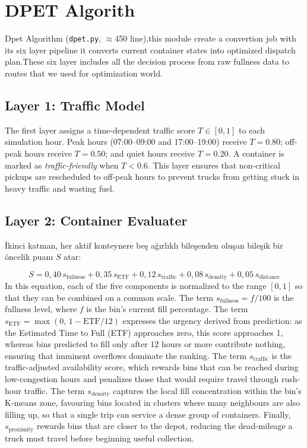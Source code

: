 \documentclass[12pt,a4paper]{report}
\begin{document}
\section{DPET Algorith}

\indent Dpet Algorithm (\texttt{dpet.py}, $\approx$450 line),this module create a convertion job with its six layer pipeline it converts current container states into optimized dispatch plan.These six layer includes all the decision process from raw fullness data to routes that we used for optimization world.

\subsection{Layer 1: Traffic Model}
\indent The first layer assigns a time-dependent traffic score $T \in [0, 1]$ to each simulation hour. Peak hours (07:00–09:00 and 17:00–19:00) receive $T = 0.80$; off-peak hours receive $T = 0.50$; and quiet hours receive $T = 0.20$. A container is marked as \textit{traffic-friendly} when $T < 0.6$. This layer ensures that non-critical pickups are rescheduled to off-peak hours to prevent trucks from getting stuck in heavy traffic and wasting fuel.

\subsection{Layer 2: Container Evaluater}

\indent İkinci katman, her aktif konteynere beş ağırlıklı bileşenden oluşan bileşik bir öncelik puanı $S$ atar:

\begin{equation}
  S = 0{,}40\,s_{\text{fullness}} + 0{,}35\,s_{\text{ETF}} + 0{,}12\,s_{\text{traffic}} + 0{,}08\,s_{\text{density}} + 0{,}05\,s_{\text{distance}}
  \label{eq:bin_score}
\end{equation}
\indent In this equation, each of the five components is normalized to the range $[0, 1]$ so that they can be combined on a common scale. The term $s_{\text{fullness}} = f/100$ is the  fullness level, where $f$ is the bin's current fill percentage. The term $s_{\text{ETF}} = \max(0,\,1 - \text{ETF}/12)$ expresses the urgency derived from prediction: as the Estimated Time to Full (ETF) approaches zero, this score approaches 1, whereas bins predicted to fill only after 12 hours or more contribute nothing, ensuring that imminent overflows dominate the ranking. The term $s_{\text{traffic}}$ is the traffic-adjusted availability score, which rewards bins that can be reached during low-congestion hours and penalizes those that would require travel through rush-hour traffic. The term $s_{\text{density}}$ captures the local fill concentration within the bin's K-means zone, favouring bins located in clusters where many neighbours are also filling up, so that a single trip can service a dense group of containers. Finally, $s_{\text{proximity}}$ rewards bins that are closer to the depot, reducing the dead-mileage a truck must travel before beginning useful collection.
\end{document}
